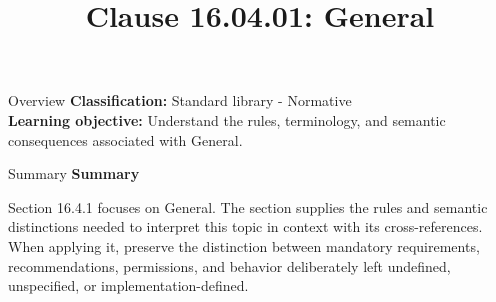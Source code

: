 \documentclass[10pt,letterpaper]{article}
\title{Clause 16.04.01: General}
\author{}
\date{}
\begin{document}
\maketitle
\begin{CornellOverviewBox}{Overview}
\textbf{Classification:} Standard library - Normative\\[2pt]
\textbf{Learning objective:} Understand the rules, terminology, and semantic consequences associated with General.
\end{CornellOverviewBox}\begin{CornellSummaryBox}{Summary}
{\sffamily\bfseries\color{Accent} Summary}\par\vspace{3pt}Section 16.4.1 focuses on General. The section supplies the rules and semantic distinctions needed to interpret this topic in context with its cross-references. When applying it, preserve the distinction between mandatory requirements, recommendations, permissions, and behavior deliberately left undefined, unspecified, or implementation-defined.
\end{CornellSummaryBox}
\end{document}
